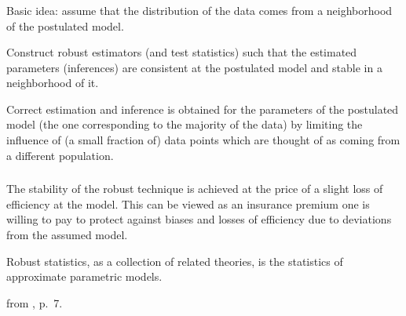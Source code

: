 \documentclass{beamer}
\newcommand{\bs}{\bigskip}
\begin{document}
\begin{frame}
\frametitle{}
Basic idea: assume that the distribution of the data comes from a
{\color{blue}neighborhood of the postulated model}.

\bs
Construct robust estimators (and test statistics) such that the estimated
parameters (inferences) are consistent at the postulated model and stable in a
neighborhood of it.

Correct estimation and inference is obtained for the parameters of the
postulated model (the one corresponding to the {\color{blue}majority of the
data}) by limiting
the influence of (a small fraction of) data points which are thought of as
coming from a different population.
\end{frame}

\begin{frame}
\frametitle{}
The {\color{blue}stability} of the robust technique is achieved at the price of
a slight loss of {\color{blue}efficiency} at the model. This can be viewed as an
insurance premium one is willing to pay to protect against biases and losses of
efficiency due to deviations from the assumed model.

\begin{center}
{\LARGE{\color{blue}Robust statistics, as a collection of related theories, is
the statistics of approximate parametric models.}}
\end{center}

\bs

from , p.~7.
\end{frame}
\end{document}

